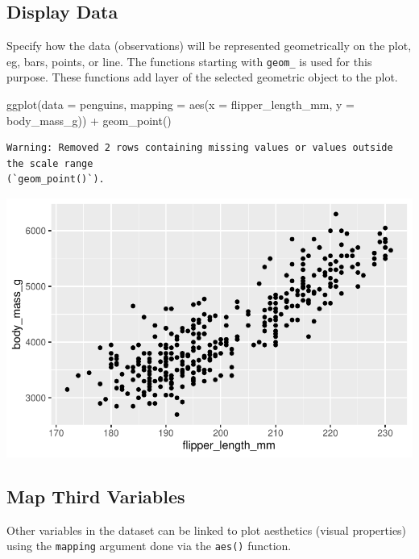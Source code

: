 \documentclass[
  letterpaper,
  DIV=11,
  numbers=noendperiod]{scrreprt}
\newenvironment{Shaded}{\begin{snugshade}}{\end{snugshade}}
\newcommand{\AttributeTok}[1]{\textcolor[rgb]{0.40,0.45,0.13}{#1}}
\newcommand{\FunctionTok}[1]{\textcolor[rgb]{0.28,0.35,0.67}{#1}}
\newcommand{\NormalTok}[1]{\textcolor[rgb]{0.00,0.23,0.31}{#1}}
\newcommand{\SpecialCharTok}[1]{\textcolor[rgb]{0.37,0.37,0.37}{#1}}
\begin{document}
\subsection{Display Data}\label{display-data}

Specify how the data (observations) will be represented geometrically on
the plot, eg, bars, points, or line. The functions starting with
\texttt{geom\_} is used for this purpose. These functions add layer of
the selected geometric object to the plot.

\begin{Shaded}
\begin{Highlighting}[]
\FunctionTok{ggplot}\NormalTok{(}\AttributeTok{data =}\NormalTok{ penguins,}
       \AttributeTok{mapping =} \FunctionTok{aes}\NormalTok{(}\AttributeTok{x =}\NormalTok{ flipper\_length\_mm, }\AttributeTok{y =}\NormalTok{ body\_mass\_g)) }\SpecialCharTok{+}
  \FunctionTok{geom\_point}\NormalTok{()}
\end{Highlighting}
\end{Shaded}

\begin{verbatim}
Warning: Removed 2 rows containing missing values or values outside the scale range
(`geom_point()`).
\end{verbatim}

\includegraphics{src/r-for-data-science/01-data-viz_files/figure-pdf/unnamed-chunk-9-1.pdf}

\subsection{Map Third Variables}\label{map-third-variables}

Other variables in the dataset can be linked to plot aesthetics (visual
properties) using the \texttt{mapping} argument done via the
\texttt{aes()} function.
\end{document}
